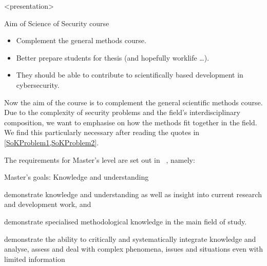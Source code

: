 \begin{frame}<presentation>
  \begin{block}{Aim of Science of Security course}
    \begin{itemize}
      \item Complement the general methods course.
      \item Better prepare students for thesis (and hopefully worklife \dots).
      \item They should be able to contribute to scientifically based 
        development in cybersecurity.
    \end{itemize}
  \end{block}
\end{frame}


Now the aim of the course is to complement the general scientific methods 
course.
Due to the complexity of security problems and the field's interdisciplinary 
composition, we want to emphasise on how the methods fit together in the field.
We find this particularly necessary after reading the quotes in 
\cref{SoKProblem1,SoKProblem2}.

The requirements for Master's level are set out in 
~\autocite{HEO2}, namely:
  \begin{block}{Master's goals: Knowledge and understanding~\autocite{HEO2}}
      \item\label{K1} demonstrate knowledge and understanding \textelp{} as 
        well as insight into current research and development work, and
      \item\label{K2} demonstrate specialised methodological knowledge in the 
        main field of study.
      \item\label{K3} demonstrate the ability to critically and systematically 
        integrate knowledge and analyse, assess and deal with complex 
        phenomena, issues and situations even with limited information
  \end{block}

